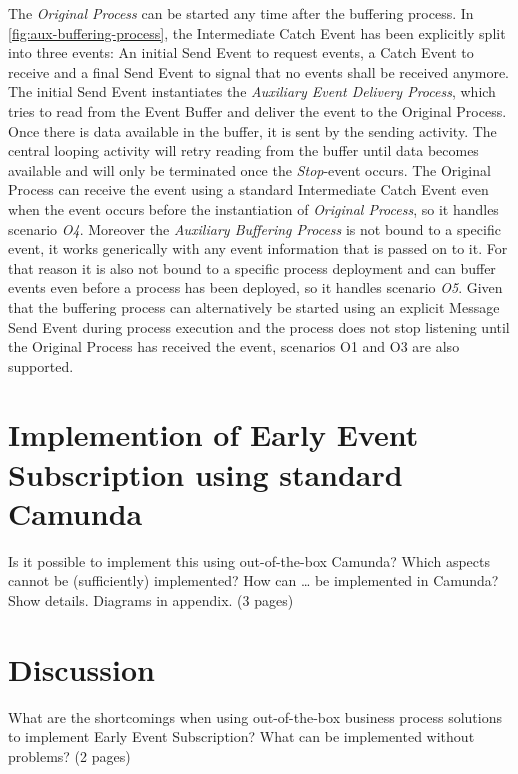 
The \textit{Original Process} can be started any time after the buffering process. In \autoref{fig:aux-buffering-process}, the Intermediate Catch Event has been explicitly split into three events: An initial Send Event to request events, a Catch Event to receive and a final Send Event to signal that no events shall be received anymore.
The initial Send Event instantiates the \textit{Auxiliary Event Delivery Process}, which tries to read from the Event Buffer and deliver the event to the Original Process. Once there is data available in the buffer, it is sent by the sending activity. The central looping activity will retry reading from the buffer until data becomes available and will only be terminated once the \textit{Stop}-event occurs. 
The Original Process can receive the event using a standard Intermediate Catch Event even when the event occurs before the instantiation of \textit{Original Process}, so it handles scenario \textit{O4}. 
Moreover the \textit{Auxiliary Buffering Process} is not bound to a specific event, it works generically with any event information that is passed on to it. For that reason it is also not bound to a specific process deployment and can buffer events even before a process has been deployed, so it handles scenario \textit{O5}.
Given that the buffering process can alternatively be started using an explicit Message Send Event during process execution and the process does not stop listening until the Original Process has received the event, scenarios O1 and O3 are also supported.


\section{Implemention of Early Event Subscription using standard Camunda}
Is it possible to implement this using out-of-the-box Camunda?
Which aspects cannot be (sufficiently) implemented?
How can … be implemented in Camunda? Show details. Diagrams in appendix.
(3 pages)

\section{Discussion}
What are the shortcomings when using out-of-the-box business process solutions to implement
Early Event Subscription?
What can be implemented without problems?
(2 pages)